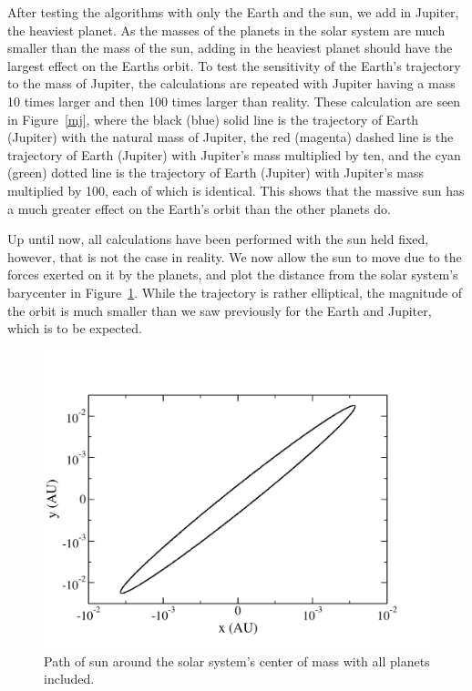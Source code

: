 \documentclass[prc,amsmath,twocolumn,superscriptaddress]{revtex4}
\begin{document}
After testing the algorithms with only the Earth and the sun, we add in Jupiter, the heaviest planet. As the masses of the planets in the solar system are much smaller than the mass of the sun, adding in the heaviest planet should have the largest effect on the Earths orbit. To test the sensitivity of the Earth's trajectory to the mass of Jupiter, the calculations are repeated with Jupiter having a mass 10 times larger and then 100 times larger than reality. These calculation are seen in Figure~\ref{mj}, where the black (blue) solid line is the trajectory of Earth (Jupiter) with the natural mass of Jupiter, the red (magenta) dashed line is the trajectory of Earth (Jupiter) with Jupiter's mass multiplied by ten, and the cyan (green) dotted line is the trajectory of Earth (Jupiter) with Jupiter's mass multiplied by 100, each of which is identical. This shows that the massive sun has a much greater effect on the Earth's orbit than the other planets do.

Up until now, all calculations have been performed with the sun held fixed, however, that is not the case in reality. We now allow the sun to move due to the forces exerted on it by the planets, and plot the distance from the solar system's barycenter in Figure~\ref{sun}. While the trajectory is rather elliptical, the magnitude of the orbit is much smaller than we saw previously for the Earth and Jupiter, which is to be expected.

\begin{figure}[t]
\includegraphics[scale=0.33]{sun.pdf}
\caption{Path of sun around the solar system's center of mass with all planets included.}
\label{sun}
\end{figure}
\end{document}

